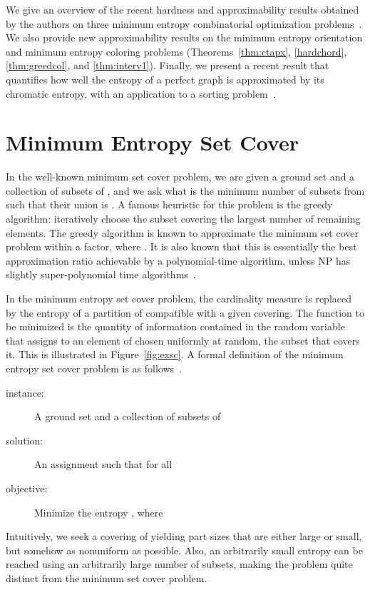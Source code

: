 \documentclass[10pt,a4paper]{article}
\begin{document}
We give an overview of the recent hardness and approximability results 
obtained by the authors on three minimum entropy combinatorial optimization problems~\cite{CFJ07,CFJ08b,CFJ08a}. We also provide new approximability results on the minimum entropy orientation and minimum entropy coloring problems (Theorems~\ref{thm:ctapx}, \ref{hardchord}, \ref{thm:greedcol}, and \ref{thm:interv1}). Finally, we present a recent result that quantifies how well the entropy of a perfect graph is approximated by its chromatic entropy, with an application to a sorting problem~\cite{POP_SICOMP}.

\section{Minimum Entropy Set Cover}

In the well-known minimum set cover problem, we are given a ground set  and a collection  of subsets of , and we ask what is the minimum number of subsets from  such that their union is . A famous heuristic for this problem is the greedy algorithm: iteratively choose the subset covering the largest number of remaining elements. The greedy algorithm is known to approximate the minimum set cover problem within a  factor, where . It is also known that this is essentially the best approximation ratio achievable by a polynomial-time algorithm, unless NP has slightly super-polynomial time algorithms~\cite{F98}.\medskip

In the minimum entropy set cover problem, the cardinality measure is replaced by the entropy of a partition of  compatible with a given covering. The function to be minimized is the quantity of information contained in the random variable that assigns to an element of  chosen uniformly at random, the subset that covers it. This is illustrated in Figure~\ref{fig:exsc}.
A formal definition of the minimum entropy set cover problem is as follows~\cite{HK05,CFJ08a}.
\begin{description}
\item[\sc instance:] A ground set  and a collection  of subsets of 
\item[\sc solution:] An assignment  such that  for all 
\item[\sc objective:] Minimize the entropy , where 
\end{description}
Intuitively, we seek a covering of  yielding part sizes that are either large or small, but somehow as nonuniform as possible. Also, an arbitrarily small entropy can be reached using an arbitrarily large number of subsets, making the problem quite distinct from the minimum set cover problem.
\end{document}
